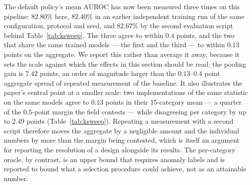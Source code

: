 The default policy's mean AUROC has now been measured three times on this
pipeline: $82.80\%$ here, $82.40\%$ in an earlier independent training run of
the same configuration, protocol and seed, and $82.67\%$ by the
second evaluation script behind Table~\ref{tab:ksweep}. The three agree to within
$0.4$ points, and the two that share the same trained models --- the first and the
third --- to within $0.13$ points on the aggregate. We report this rather than
average it away, because it sets the scale against which the effects in this
section should be read: the pooling gain is $7.42$ points, an order of magnitude
larger than the $0.13$--$0.4$ point aggregate spread of repeated measurement of
the baseline. It also illustrates the paper's central point at a smaller scale:
two implementations of the same statistic on the same models agree to $0.13$ points
in their 15-category mean --- a quarter of the $0.5$-point margin the field
contests --- while disagreeing per category by up to $2.49$ points
(Table~\ref{tab:ksweep}). Repeating a measurement with a second script therefore
moves the aggregate by a negligible amount and the individual numbers by more than
the margin being contested, which is itself an argument for reporting the
resolution of a design alongside its results. The per-category oracle, by
contrast, is an upper bound that requires anomaly labels and is reported to bound
what a selection procedure could achieve, not as an attainable number.

